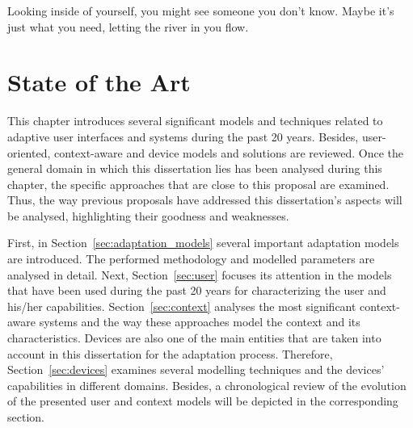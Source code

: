 

\begin{savequote}[50mm]
Looking inside of yourself, you might see someone you don't know. 
Maybe it's just what you need, letting the river in you flow. 
%
\end{savequote}


\chapter{State of the Art}
\label{cha:state_of_the_art}

\ifpdf
    \graphicspath{{2_state_of_the_art/figures/PNG/}{2_state_of_the_art/figures/PDF/}{2_state_of_the_art/figures/}}
\else
    \graphicspath{{2_state_of_the_art/figures/EPS/}{2_state_of_the_art/figures/}}
\fi


This chapter introduces several significant models and techniques related to 
adaptive user interfaces and systems during the past 20 years. Besides, user-oriented,
context-aware and device models and solutions are reviewed. Once the general
domain in which this dissertation lies has been analysed during this chapter,
the specific approaches that are close to this proposal are examined. Thus, 
the way previous proposals have addressed this dissertation's aspects will be 
analysed, highlighting their goodness and weaknesses.  

First, in Section~\ref{sec:adaptation_models} several important adaptation models
are introduced. The performed methodology and modelled parameters are analysed in
detail. Next, Section~\ref{sec:user} focuses its attention in the models
that have been used during the past 20 years for characterizing the user and his/her
capabilities. Section~\ref{sec:context} analyses the most significant
context-aware systems and the way these approaches model the context and its
characteristics. Devices are also one of the main entities that are taken into
account in this dissertation for the adaptation process. Therefore, Section~\ref{sec:devices}
examines several modelling techniques and the devices' capabilities in different
domains. Besides, a chronological review of the evolution of the presented user 
and context models will be depicted in the corresponding section.






